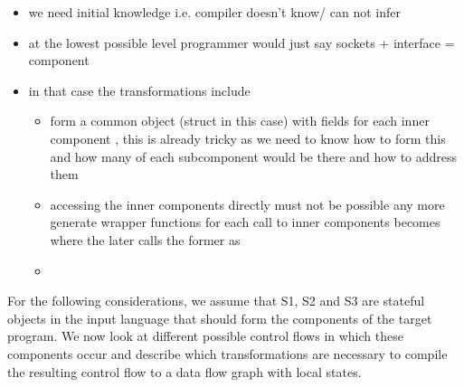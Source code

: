 \begin{itemize}
    \item we need initial knowledge i.e. compiler doesn't know/ can not infer
    \item at the lowest possible level programmer would just say sockets + interface = component
    \item in that case the transformations include
    \begin{itemize}
        \item form a common object (struct in this case) with fields for each inner component , this is already tricky as we need to know how to form this and how many of each subcomponent would be there and how to address them
        \item accessing the inner components directly must not be possible any more \means generate wrapper functions for each call to inner components \means {} becomes  where the later calls the former as  
        \item {}
    \end{itemize}
\end{itemize}


For the following considerations, we assume that S1, S2 and S3 are stateful objects in the input language that should form the components of the target program. We now look at different possible control flows in which these components occur and describe which transformations are necessary to compile the resulting control flow to a data flow graph with local states. 

